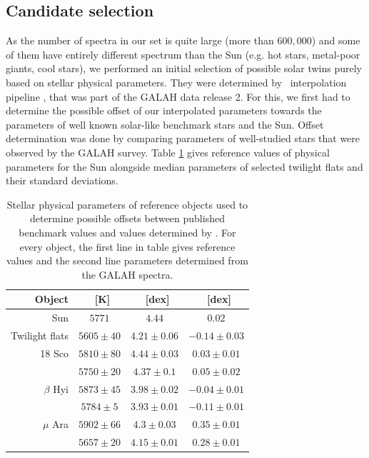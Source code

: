 \subsection{Candidate selection}
\label{sec:05_candidates}
As the number of spectra in our set is quite large (more than $600,000$) and some of them have entirely different spectrum than the Sun (e.g. hot stars, metal-poor giants, cool stars), we performed an initial selection of possible solar twins purely based on stellar physical parameters. They were determined by \TC\ interpolation pipeline \cite{buder2018}, that was part of the GALAH data release 2. For this, we first had to determine the possible offset of our interpolated parameters towards the parameters of well known solar-like benchmark stars \cite{2014A&A...564A.133J, 2015A&A...582A..49H} and the Sun. Offset determination was done by comparing parameters of well-studied stars that were observed by the GALAH survey. Table \ref{tab:params_twins} gives reference values of physical parameters for the Sun alongside median parameters of selected twilight flats and their standard deviations. 

\begin{table}
	\centering
	\caption{Stellar physical parameters of reference objects used to determine possible offsets between published benchmark values and values determined by \TC. For every object, the first line in table gives reference values and the second line parameters determined from the GALAH spectra.}
	\label{tab:params_twins}
	\begin{tabular}{r c c c}
		\hline
		Object & \Teff\ [K] & \Logg\ [dex] & \Feh\ [dex] \\ 
		\hline
		Sun & $5771$ & $4.44$ & $0.02$ \\ 
		Twilight flats & $5605 \pm 40$ & $4.21 \pm 0.06$ & $-0.14 \pm 0.03$ \\ 
		\hline
		18 Sco & $5810 \pm 80$ & $4.44 \pm 0.03$ & $0.03 \pm 0.01$ \\
		& $5750 \pm 20 $ & $4.37 \pm 0.1$ & $ 0.05 \pm 0.02$ \\ 
		\hline
		$\beta$ Hyi & $5873 \pm 45$ & $3.98 \pm 0.02$ & $-0.04 \pm 0.01$ \\
		& $5784 \pm 5$ & $3.93 \pm 0.01$ & $-0.11 \pm 0.01$ \\ 
		\hline
		$\mu$ Ara & $5902 \pm 66$ & $4.3 \pm 0.03$ & $0.35 \pm 0.01$ \\
		& $5657 \pm 20$ & $4.15 \pm 0.01$ & $0.28 \pm 0.01$ \\
		\hline
	\end{tabular}
\end{table}


